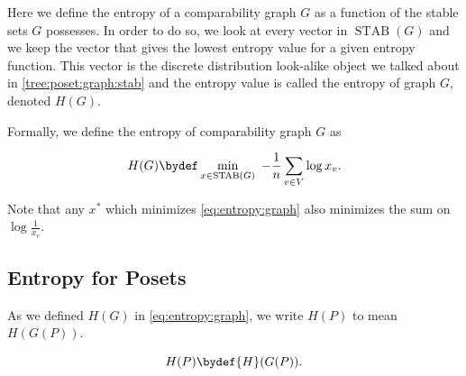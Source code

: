 Here we define the entropy of a comparability graph $G$ as a function of the
stable sets $G$ possesses. In order to do so, we look at every vector in
$\operatorname{STAB}(G)$ and we keep the vector that gives the lowest entropy
value for a given entropy function. This vector is the discrete distribution
look-alike object we talked about in \ref{tree:poset:graph:stab} and the
entropy value is called the entropy of graph $G$, denoted ${H}(G)$.

Formally, we define the entropy of comparability graph $G$ as

\begin{equation}
{H}(G) \bydef \min_{x \in \operatorname{STAB}(G)}~ -\frac{1}{n} \sum_{v \in
V} \log x_v.
\label{eq:entropy:graph}
\end{equation}

Note that any $x^*$ which minimizes \ref{eq:entropy:graph} also minimizes the
sum on $\log \frac{1}{x_v}$.



\subsection*{Entropy for Posets}


As we defined ${H}(G)$ in \ref{eq:entropy:graph}, we write ${H}(P)$ to mean
${H}(G(P))$.

\begin{equation}
{H}(P) \bydef {H}({G}(P)).
\label{eq:entropy:poset}
\end{equation}
